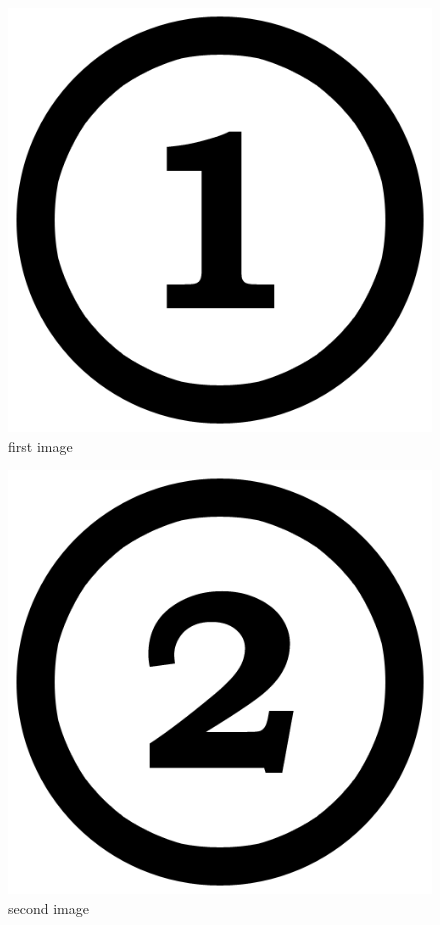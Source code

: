 \documentclass[12pt]{article}
\begin{document}
\begin {figure}[!htb]
	\includegraphics[width=1.\textwidth]{question_1/one.png}
	\caption{first image }
	\label{imageone}
\end {figure}

\begin {figure}[!htb]
	\includegraphics[width=1.\textwidth]{question_2/two.png}
	\caption{second image}
	\label{imagetwo}
\end {figure}
\end{document}
